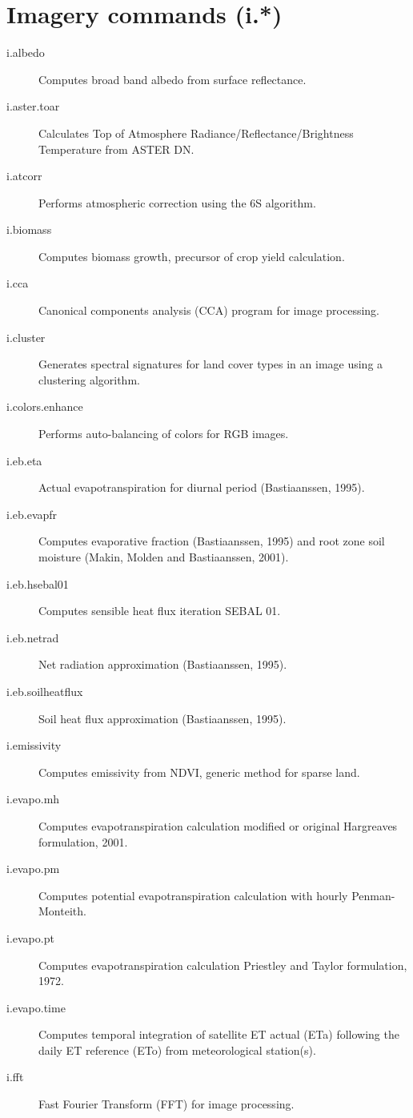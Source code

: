 
\section{Imagery commands (i.{*})}
\begin{description}
\item [{i.albedo}] Computes broad band albedo from surface reflectance.
\item [{i.aster.toar}] Calculates Top of Atmosphere Radiance/Reflectance/Brightness
Temperature from ASTER DN.
\item [{i.atcorr}] Performs atmospheric correction using the 6S algorithm.
\item [{i.biomass}] Computes biomass growth, precursor of crop yield calculation.
\item [{i.cca}] Canonical components analysis (CCA) program for image processing.
\item [{i.cluster}] Generates spectral signatures for land cover types
in an image using a clustering algorithm.
\item [{i.colors.enhance}] Performs auto-balancing of colors for RGB images.
\item [{i.eb.eta}] Actual evapotranspiration for diurnal period (Bastiaanssen,
1995).
\item [{i.eb.evapfr}] Computes evaporative fraction (Bastiaanssen, 1995)
and root zone soil moisture (Makin, Molden and Bastiaanssen, 2001).
\item [{i.eb.hsebal01}] Computes sensible heat flux iteration SEBAL 01.
\item [{i.eb.netrad}] Net radiation approximation (Bastiaanssen, 1995).
\item [{i.eb.soilheatflux}] Soil heat flux approximation (Bastiaanssen,
1995).
\item [{i.emissivity}] Computes emissivity from NDVI, generic method for
sparse land.
\item [{i.evapo.mh}] Computes evapotranspiration calculation modified or
original Hargreaves formulation, 2001.
\item [{i.evapo.pm}] Computes potential evapotranspiration calculation
with hourly Penman-Monteith.
\item [{i.evapo.pt}] Computes evapotranspiration calculation Priestley
and Taylor formulation, 1972.
\item [{i.evapo.time}] Computes temporal integration of satellite ET actual
(ETa) following the daily ET reference (ETo) from meteorological station(s).
\item [{i.fft}] Fast Fourier Transform (FFT) for image processing.

\end{description}
